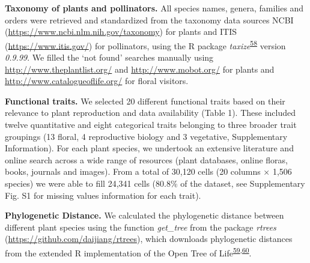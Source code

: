 \documentclass[
  12pt,
  a4paper,
]{article}
\begin{document}
\textbf{Taxonomy of plants and pollinators.} All species names, genera, families and orders were retrieved and standardized from the taxonomy data sources NCBI (\url{https://www.ncbi.nlm.nih.gov/taxonomy}) for plants and ITIS (\url{https://www.itis.gov/}) for pollinators, using the R package \emph{taxize}\textsuperscript{\protect\hyperlink{ref-chamberlain2020}{58}} version \emph{0.9.99}. We filled the `not found' searches manually using \url{http://www.theplantlist.org/} and \url{http://www.mobot.org/} for plants and \url{http://www.catalogueoflife.org/} for floral visitors.

\textbf{Functional traits.} We selected 20 different functional traits based on their relevance to plant reproduction and data availability (Table 1). These included twelve quantitative and eight categorical traits belonging to three broader trait groupings (13 floral, 4 reproductive biology and 3 vegetative, Supplementary Information). For each plant species, we undertook an extensive literature and online search across a wide range of resources (plant databases, online floras, books, journals and images). From a total of 30,120 cells (20 columns × 1,506 species) we were able to fill 24,341 cells (80.8\% of the dataset, see Supplementary Fig. S1 for missing values information for each trait).

\textbf{Phylogenetic Distance.} We calculated the phylogenetic distance between different plant species using the function \emph{get\_tree} from the package \emph{rtrees} (\url{https://github.com/daijiang/rtrees}), which downloads phylogenetic distances from the extended R implementation of the Open Tree of Life\textsuperscript{\protect\hyperlink{ref-smith2018}{59},\protect\hyperlink{ref-jin2019}{60}}.

\singlespacing
\end{document}

